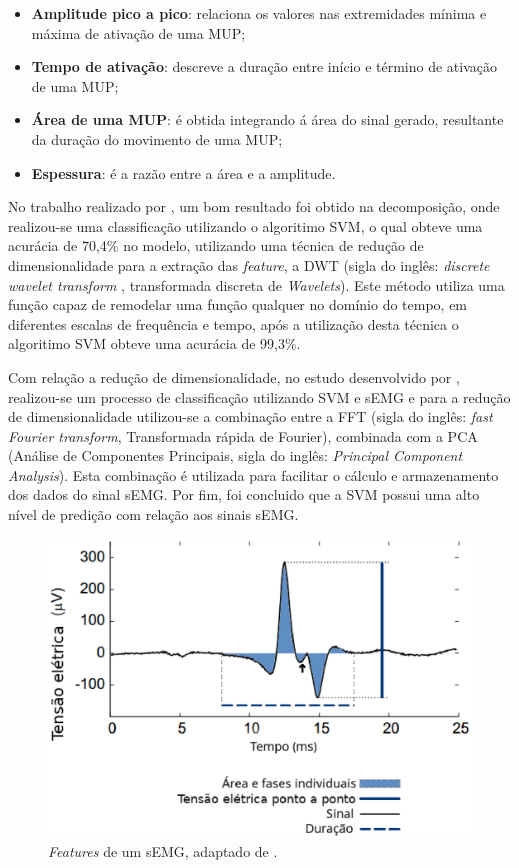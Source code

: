 \begin{itemize}
    \item \textbf{Amplitude pico a pico}: relaciona os valores nas extremidades mínima e máxima de ativação de uma MUP;
    \item \textbf{Tempo de ativação}: descreve a duração entre início e término de ativação de uma MUP;
    \item \textbf{Área de uma MUP}: é obtida integrando á área do sinal gerado, resultante da duração do movimento de uma MUP;
    \item \textbf{Espessura}: é a razão entre a área e a amplitude.
\end{itemize}

No trabalho realizado por , um bom resultado foi obtido na decomposição, onde realizou-se uma classificação utilizando o algoritimo SVM, o qual obteve uma acurácia de 70,4\% no modelo, utilizando uma técnica de redução de dimensionalidade para a extração das \textit{feature}, a DWT (sigla do inglês: \textit{discrete wavelet transform }, transformada discreta de \textit{Wavelets}). Este método utiliza uma função capaz de remodelar uma função qualquer no domínio do tempo, em diferentes escalas de frequência e tempo, após a utilização desta técnica o algoritimo SVM obteve uma acurácia de 99,3\%.

Com relação a redução de dimensionalidade, no estudo desenvolvido por , realizou-se um processo de classificação utilizando SVM e sEMG e para a redução de dimensionalidade utilizou-se a combinação entre a FFT (sigla do inglês: \textit{fast Fourier transform}, Transformada rápida de Fourier), combinada com a PCA (Análise de Componentes Principais, sigla do inglês: \textit{Principal Component Analysis}). Esta combinação é utilizada para facilitar o cálculo e armazenamento dos dados do sinal sEMG. Por fim,  foi concluido que a SVM possui uma alto nível de predição com relação aos sinais sEMG.

\begin{figure}[h]
    \centering
     \includegraphics[width=1\textwidth]{figuras/featuresEMG.eps}
     \caption{\textit{Features} de um sEMG, adaptado de .}
     \label{featuresEMG}
 \end{figure}

